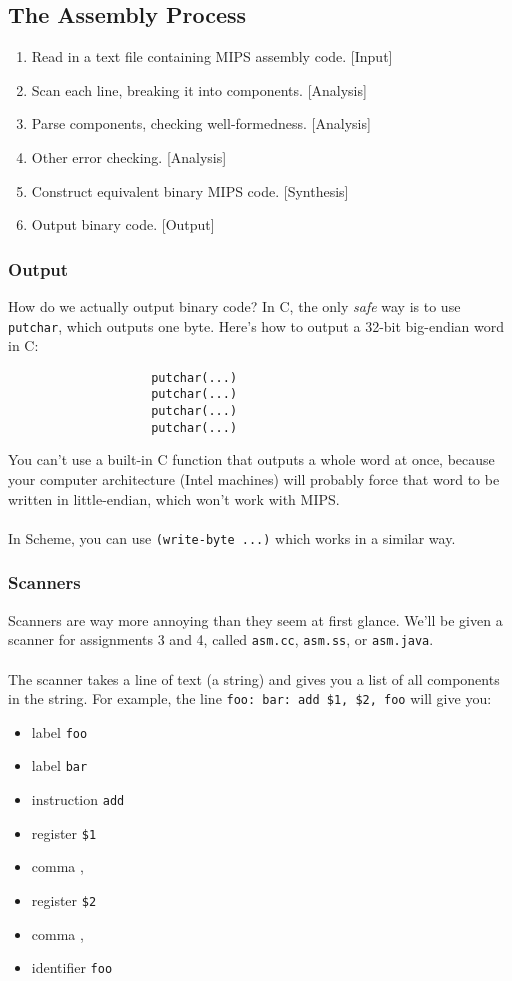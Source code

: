 \documentclass[]{article}
\theoremstyle{definition}
\begin{document}
		\subsection{The Assembly Process}
			\begin{enumerate}
				\item Read in a text file containing MIPS assembly code. [Input]
				\item Scan each line, breaking it into components. [Analysis]
				\item Parse components, checking well-formedness. [Analysis]
				\item Other error checking. [Analysis]
				\item Construct equivalent binary MIPS code. [Synthesis]
				\item Output binary code. [Output]
			\end{enumerate}

			\subsubsection{Output}
				How do we actually output binary code? In C, the only \emph{safe} way is to use \verb+putchar+, which outputs one byte. Here's how to output a 32-bit big-endian word in C:
				\begin{verbatim}
					putchar(...)
					putchar(...)
					putchar(...)
					putchar(...)
				\end{verbatim}

				You can't use a built-in C function that outputs a whole word at once, because your computer architecture (Intel machines) will probably force that word to be written in little-endian, which won't work with MIPS.
				\\ \\
				In Scheme, you can use \verb+(write-byte ...)+ which works in a similar way.
			
			\subsubsection{Scanners}
				Scanners are way more annoying than they seem at first glance. We'll be given a scanner for assignments 3 and 4, called \verb+asm.cc+, \verb+asm.ss+, or \verb+asm.java+.
				\\ \\
				The scanner takes a line of text (a string) and gives you a list of all components in the string. For example, the line \verb+foo: bar: add $1, $2, foo+ will give you:
				\begin{itemize}
					\item label \verb+foo+
					\item label \verb+bar+
					\item instruction \verb+add+
					\item register \verb+$1+
					\item comma ,
					\item register \verb+$2+
					\item comma ,
					\item identifier \verb+foo+
				\end{itemize}
\end{document}
